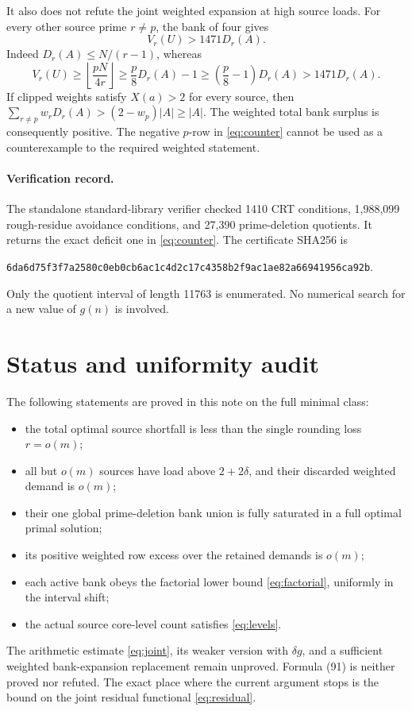 \documentclass[11pt,a4paper]{article}
\theoremstyle{remark}
\begin{document}
It also does not refute the joint weighted expansion at high
source loads. For every other source prime \(r\ne p\), the bank
of four gives
\[
 V_r(U)>1471D_r(A).
\]
Indeed \(D_r(A)\le N/(r-1)\), whereas
\[
 V_r(U)\ge\left\lfloor\frac{pN}{4r}\right\rfloor
 \ge\frac p8D_r(A)-1
 \ge\left(\frac p8-1\right)D_r(A)>1471D_r(A).
\]
If clipped weights satisfy \(X(a)>2\) for every source, then
\(\sum_{r\ne p}w_rD_r(A)>(2-w_p)|A|\ge|A|\).
The weighted total bank surplus is consequently positive.
The negative \(p\)-row in \eqref{eq:counter} cannot be used as a
counterexample to the required weighted statement.

\paragraph{Verification record.}
The standalone standard-library verifier checked 1410 CRT
conditions, 1,988,099 rough-residue avoidance conditions, and
27,390 prime-deletion quotients. It returns the exact deficit
one in \eqref{eq:counter}. The certificate SHA256 is
\begin{center}
\small\texttt{6da6d75f3f7a2580c0eb0cb6ac1c4d2c17c4358b2f9ac1ae82a66941956ca92b}.
\end{center}
Only the quotient interval of length 11763 is enumerated.
No numerical search for a new value of \(g(n)\) is involved.

\section{Status and uniformity audit}

The following statements are proved in this note on the full
minimal class:
\begin{itemize}
 \item the total optimal source shortfall is less than the single
 rounding loss \(r=o(m)\);
 \item all but \(o(m)\) sources have load above \(2+2\delta\),
 and their discarded weighted demand is \(o(m)\);
 \item their one global prime-deletion bank union is fully
 saturated in a full optimal primal solution;
 \item its positive weighted row excess over the retained
 demands is \(o(m)\);
 \item each active bank obeys the factorial lower bound
 \eqref{eq:factorial}, uniformly in the interval shift;
 \item the actual source core-level count satisfies
 \eqref{eq:levels}.
\end{itemize}
The arithmetic estimate \eqref{eq:joint}, its weaker version
with \(\delta g\), and a sufficient weighted bank-expansion
replacement remain unproved. Formula (91) is neither proved
nor refuted. The exact place where the current argument stops
is the bound on the joint residual functional
\eqref{eq:residual}.
\end{document}
